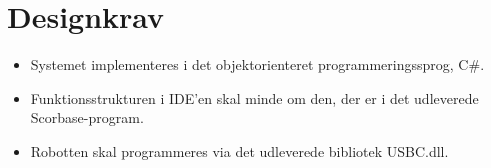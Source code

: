 \section{Designkrav}
\begin{itemize}
\item Systemet implementeres i det objektorienteret programmeringssprog, C\#.
\item Funktionsstrukturen i IDE'en skal minde om den, der er i det udleverede Scorbase-program.
\item Robotten skal programmeres via det udleverede bibliotek USBC.dll.

\end{itemize}

